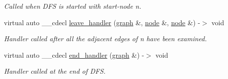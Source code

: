 \begin{DoxyCompactItemize}
\begin{DoxyCompactList}\small\item\em Called when D\+FS is started with start-\/node {\itshape n}. \end{DoxyCompactList}\item 
virtual auto \+\_\+\+\_\+cdecl \mbox{\hyperlink{classbiconnectivity_a8b3a9b88d494e05fa1407a10bf3758a2}{leave\+\_\+handler}} (\mbox{\hyperlink{classgraph}{graph}} \&, \mbox{\hyperlink{classnode}{node}} \&, \mbox{\hyperlink{classnode}{node}} \&) -\/$>$ void
\begin{DoxyCompactList}\small\item\em Handler called after all the adjacent edges of {\itshape n} have been examined. \end{DoxyCompactList}\item 
virtual auto \+\_\+\+\_\+cdecl \mbox{\hyperlink{classbiconnectivity_a8f5e44d14a03d24c4ffd445ca0151517}{end\+\_\+handler}} (\mbox{\hyperlink{classgraph}{graph}} \&) -\/$>$ void
\begin{DoxyCompactList}\small\item\em Handler called at the end of D\+FS. \end{DoxyCompactList}\end{DoxyCompactItemize}
